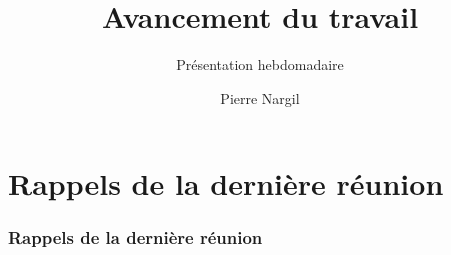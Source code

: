 \documentclass[12pt]{beamer}
\title{Avancement du travail}
\subtitle{Présentation hebdomadaire}
\author{Pierre Nargil}
\newcommand\FontReduce{\fontsize{8}{10}\selectfont}
\begin{document}
\frame{\titlepage}

\frame{\tableofcontents}


\section{Rappels de la dernière réunion}

	\begin{frame}
	
		\frametitle{Rappels de la dernière réunion}
		
		\begin{itemize}
			

\end{itemize}
\end{frame}
\end{document}
